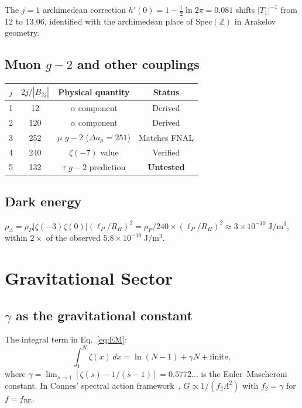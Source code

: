 \documentclass[aps,prd,twocolumn,superscriptaddress,nofootinbib]{revtex4-2}
\newcommand{\Spec}{\mathrm{Spec}}
\begin{document}
The $j=1$ archimedean correction
$h'(0)=1-\frac{1}{2}\ln 2\pi=0.081$ shifts $|T_1|^{-1}$ from 12
to 13.06, identified with the archimedean place of
$\Spec(\mathbb{Z})$ in Arakelov geometry.

\subsection{Muon $g{-}2$ and other couplings}

\begin{center}
\begin{tabular}{cccc}
\toprule
$j$ & $2j/|B_{2j}|$ & Physical quantity & Status \\
\midrule
1 & 12 & $\alpha$ component & Derived \\
2 & 120 & $\alpha$ component & Derived \\
3 & 252 & $\mu$ $g{-}2$ ($\Delta a_\mu=251$) & Matches FNAL \\
4 & 240 & $\zeta(-7)$ value & Verified \\
5 & 132 & $\tau$ $g{-}2$ prediction & \textbf{Untested} \\
\bottomrule
\end{tabular}
\end{center}

\subsection{Dark energy}

$\rho_\Lambda=\rho_P|\zeta(-3)\zeta(0)|(\ell_P/R_H)^2=\rho_P/240
\times(\ell_P/R_H)^2\approx 3\times 10^{-10}\;\mathrm{J/m^3}$,
within $2\times$ of the observed $5.8\times 10^{-10}\;\mathrm{J/m^3}$.

\section{Gravitational Sector}\label{sec:gravity}

\subsection{$\gamma$ as the gravitational constant}

The integral term in Eq.~\eqref{eq:EM}:
\begin{equation}
  \int_1^N\zeta(x)\,dx = \ln(N{-}1)+\gamma N+\text{finite},
\end{equation}
where $\gamma=\lim_{s\to 1}[\zeta(s)-1/(s{-}1)]=0.5772\ldots$ is
the Euler--Mascheroni constant.  In Connes' spectral action
framework~\cite{Connes1996}, $G\propto 1/(f_2\Lambda^2)$ with
$f_2=\gamma$ for $f=f_{\mathrm{BE}}$.
\end{document}

